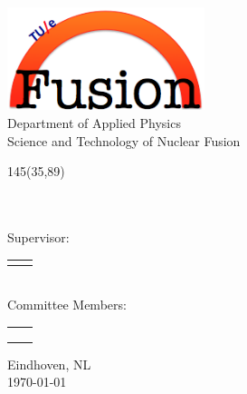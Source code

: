 \begin{titlepage}
\begin{center}
\includegraphics[height=3cm]{../Graphics/tue_fusion_logo}\\
\large
Department of Applied Physics  \\
Science and Technology of Nuclear Fusion

\vspace*{10cm}

\setlength{\TPHorizModule}{1mm}
\setlength{\TPVertModule}{\TPHorizModule}
\newlength{\backupparindent}
\setlength{\backupparindent}{\parindent}
\setlength{\parindent}{0mm}			
\begin{textblock}{145}(35,89)
	\vspace*{1mm}
	\huge
	\textbf{\doctitle \\}
	\Large
	\vspace*{8mm}
	\textit{\docsubtitle}\\
	\vspace*{15mm}
	\Large
	\me\\
\end{textblock}

\large
Supervisor:\\
\begin{tabular}{rl}
	\firstCommitteeMember\\
\end{tabular}
\\ \vspace*{5mm}
Committee Members:\\\vspace*{2mm}
\begin{tabular}{rl}
	\secondCommitteeMember\\
	\thirdCommitteeMember\\
	\fourthCommitteeMember\\
\end{tabular}


\vfill
\large
Eindhoven, NL\\
\today\\

\setlength{\parindent}{\backupparindent}
\end{center}
\end{titlepage}

